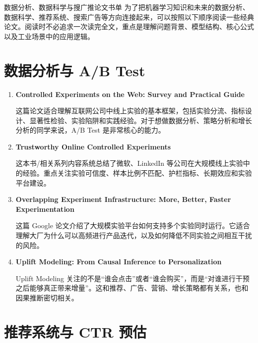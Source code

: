 \begin{dxtips}{数据分析、数据科学与搜广推论文书单}
为了把机器学习知识和未来的数据分析、数据科学、推荐系统、搜索广告等方向连接起来，可以按照以下顺序阅读一些经典论文。阅读时不必追求一次读完全文，重点是理解问题背景、模型结构、核心公式以及工业场景中的应用逻辑。
\end{dxtips}

\section{数据分析与 A/B Test}

\begin{enumerate}
    \item \textbf{Controlled Experiments on the Web: Survey and Practical Guide}

    这篇论文适合理解互联网公司中线上实验的基本框架，包括实验分流、指标设计、显著性检验、实验陷阱和实践经验。对于想做数据分析、策略分析和增长分析的同学来说，A/B Test 是非常核心的能力。

    \item \textbf{Trustworthy Online Controlled Experiments}

    这本书/相关系列内容系统总结了微软、LinkedIn 等公司在大规模线上实验中的经验。重点关注实验可信度、样本比例不匹配、护栏指标、长期效应和实验平台建设。

    \item \textbf{Overlapping Experiment Infrastructure: More, Better, Faster Experimentation}

    这篇 Google 论文介绍了大规模实验平台如何支持多个实验同时运行。它适合理解大厂为什么可以高频进行产品迭代，以及如何降低不同实验之间相互干扰的风险。

    \item \textbf{Uplift Modeling: From Causal Inference to Personalization}

    Uplift Modeling 关注的不是“谁会点击”或者“谁会购买”，而是“对谁进行干预之后能够真正带来增量”。这和推荐、广告、营销、增长策略都有关系，也和因果推断密切相关。
\end{enumerate}

\section{推荐系统与 CTR 预估}

